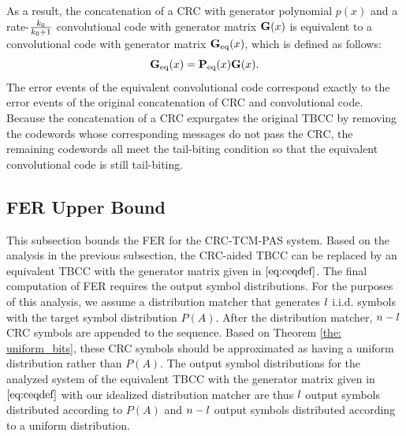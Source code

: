 \documentclass [PhD] {uclathes}
\begin{document}
As a result, the concatenation of a CRC with generator polynomial $p(x)$ and a rate-$\frac{k_0}{k_0+1}$ convolutional code with generator matrix $\mathbf{G}(x)$ is equivalent to a  convolutional code with generator matrix $\mathbf{G}_{\mathrm{eq}}(x)$, which is defined as follows:
\begin{equation}\label{eq:ceqdef}
\mathbf{G}_{\mathrm{eq}}(x) = \mathbf{P}_{\mathrm{eq}}(x) \mathbf{G}(x).
\end{equation}
The error events of the equivalent convolutional code correspond exactly to the error events of the original concatenation of CRC and convolutional code.
Because the concatenation of a CRC expurgates the original TBCC by removing the codewords whose corresponding messages do not pass the CRC, the remaining codewords all meet the tail-biting condition so that the equivalent convolutional code is still tail-biting. 

\subsection{FER Upper Bound} \label{subsec: fer_upperbound}
This subsection bounds the FER for the CRC-TCM-PAS system. Based on the analysis in the previous subsection, the CRC-aided TBCC can be replaced by an equivalent TBCC with the generator matrix given in $\eqref{eq:ceqdef}$. The final computation of FER requires the output symbol distributions.  For the purposes of this analysis, we assume a  distribution matcher that generates $l$ i.i.d. symbols with the target symbol distribution $P(A)$.  After the distribution matcher, $n-l$ CRC symbols are appended to the sequence.  Based on Theorem \ref{the: uniform_bits}, these CRC symbols should be approximated as having a uniform distribution rather than $P(A)$.  
The output symbol distributions for the analyzed system of the equivalent TBCC with the generator matrix given in $\eqref{eq:ceqdef}$ with our idealized distribution matcher are thus $l$ output symbols distributed according to $P(A)$ and $n-l$ output symbols distributed according to a uniform distribution. 
\end{document}
